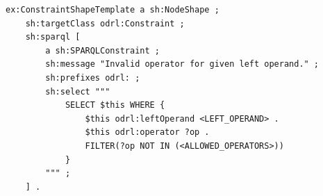 \begin{scriptsize}
\begin{lstlisting}[language=turtle, caption=Template shape to detect the usage of an invalid operator for a given left operand., label=lst:shacl]
ex:ConstraintShapeTemplate a sh:NodeShape ;
    sh:targetClass odrl:Constraint ;
    sh:sparql [
        a sh:SPARQLConstraint ;
        sh:message "Invalid operator for given left operand." ;
        sh:prefixes odrl: ;
        sh:select """
            SELECT $this WHERE {
                $this odrl:leftOperand <LEFT_OPERAND> .
                $this odrl:operator ?op .
                FILTER(?op NOT IN (<ALLOWED_OPERATORS>))
            }
        """ ;
    ] .
\end{lstlisting}
\end{scriptsize}